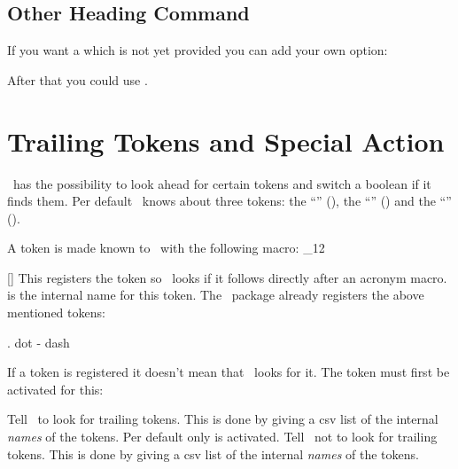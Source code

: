 \documentclass[load-preamble+]{cnltx-doc}
\makeatletter
\renewenvironment{commands}
  {%
    \cnltx@set@catcode_{12}%
    \let\command\cnltx@command
    \cnltxlist
  }
  {\endcnltxlist}
\makeatother
\begin{document}
\subsection{Other Heading Command}
If you want a  which is not yet provided you can add your
own option:
After that you could use .

\section{Trailing Tokens and Special Action}

\acro\ has the possibility to look ahead for certain tokens
and switch a boolean if it finds them.  Per default \acro\ knows about three
tokens: the \enquote{} (), the \enquote{}
(\code{-}) and the \enquote{} ().

A token is made known to \acro\ with the following macro:
\begin{commands}
  \command{AcroRegisterTrailing}[]
    This registers the token  so \acro\ looks if it follows
    directly after an acronym macro.   is the internal name for
    this token.
\end{commands}
The \acro\ package already registers the above mentioned tokens:
\begin{sourcecode}
  \AcroRegisterTrailing . {dot}
  \AcroRegisterTrailing - {dash}
  \AcroRegisterTrailing {}
\end{sourcecode}

If a token is registered it doesn't mean that \acro\ looks for it.  The token
must first be activated for this:
\begin{options}
    Tell \acro\ to look for trailing tokens.  This is done by giving a csv
    list of the internal \emph{names} of the tokens.  Per default only
     is activated.
    Tell \acro\ not to look for trailing tokens.  This is done by giving a csv
    list of the internal \emph{names} of the tokens.
\end{options}
\end{document}
